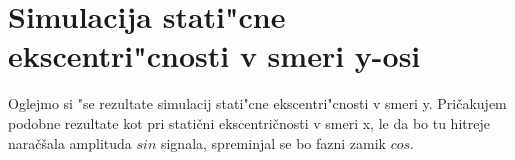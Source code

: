 %
%
%


\section{Simulacija stati"cne ekscentri"cnosti v smeri y-osi}

Oglejmo si "se rezultate simulacij stati"cne ekscentri"cnosti v smeri y. Pričakujem podobne rezultate kot pri statični ekscentričnosti v smeri x, le da bo tu hitreje naračšala amplituda $sin$ signala, spreminjal se bo fazni zamik $cos$.
 

